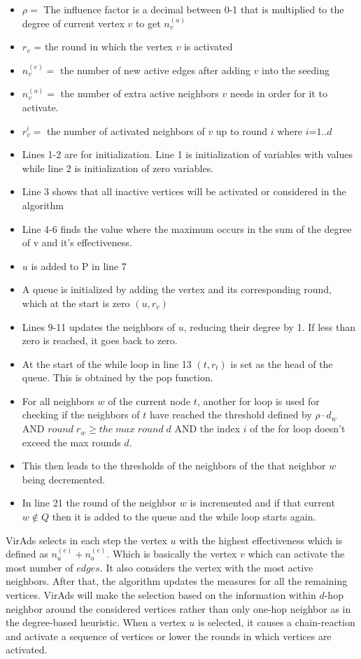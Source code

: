\begin{itemize}
	\item $\rho =$ The influence factor is a decimal between 0-1 that is multiplied to the degree of current vertex $v$ to get $n_{v}^{(a)}$
	\item $r_{v}$ = the round in which the vertex $v$ is activated
	\item $n_{v}^{(e)}=$ the number of new active edges after adding $v$ into the seeding
	\item $n_{v}^{(a)}=$ the number of extra active neighbors $v$ needs in order for it to activate.
	\item $r_{v}^{i}=$ the number of activated neighbors of $v$ up to round $i$ where $i$=$1..d$
	\item Lines 1-2 are for initialization. Line 1 is initialization of variables with values while line 2 is initialization of zero variables.
	\item Line 3 shows that all inactive vertices will be activated or considered in the algorithm
	\item Line 4-6 finds the value where the maximum occurs in the sum of the degree of v and it's effectiveness.
	\item $u$ is added to P in line 7
	\item A queue is initialized by adding the vertex and its corresponding round, which at the start is zero $(u,r_{v})$
	\item Lines 9-11 updates the neighbors of $u$, reducing their degree by 1. If less than zero is reached, it goes back to zero.
	\item At the start of the while loop in line 13 $(t,r_{t})$ is set as the head of the queue. This is obtained by the pop function. 
	\item For all neighbors $w$ of the current node $t$, another for loop is used for checking if the neighbors of $t$ have reached the threshold defined by $\rho \cdot d_{w}$ AND $round \; r_{w} \geq the\; max\; round\; d$ AND the index $i$ of the for loop doesn't exceed the max rounds $d$.
	\item This then leads to the thresholds of the neighbors of the that neighbor $w$ being decremented.
	\item In line 21 the round of the neighbor $w$ is incremented and if that current $w \notin Q$ then it is added to the queue and the while loop starts again.
\end{itemize}
VirAds selects in each step the vertex $u$ with the highest effectiveness which is defined as $n^{(e)}_{u}+n^{(e)}_{a}$. Which is basically the vertex $v$ which can activate the most number of $edges$. It also considers the vertex with the most active neighbors. After that, the algorithm updates the measures for all the remaining vertices. VirAds will make the selection based on the information within $d$-hop neighbor around the considered vertices rather than only one-hop neighbor as in the degree-based heuristic. When a vertex $u$ is selected, it causes a chain-reaction and activate a sequence of vertices or lower the rounds in which vertices are activated.\cite{virads}

